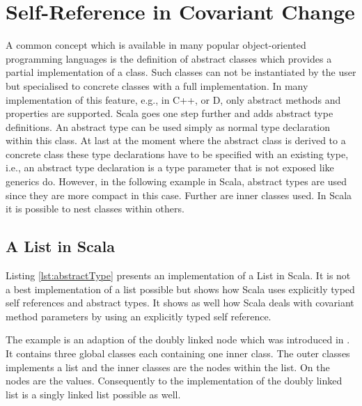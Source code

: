 \section{Self-Reference in Covariant Change}
A common concept which is available in many popular object-oriented
programming languages is the definition of abstract classes which
provides a partial implementation of a class. Such classes can not be
instantiated by the user but specialised to concrete classes with a full
implementation. In many implementation of this feature, e.g., in C++,
\cs or D, only abstract methods and properties are supported. Scala goes
one step further and adds abstract type definitions. An abstract type can
be used simply as normal type declaration within this class. At last at
the moment where the abstract class is derived to a concrete class these
type declarations have to be specified with an existing type, i.e.,
an abstract type declaration is a type parameter that is not exposed
like generics do. However, in the following example in Scala, abstract
types are used since they are more compact in this case. Further are
inner classes used. In Scala it is possible to nest classes within others.

\subsection{A List in Scala}
Listing \ref{lst:abstractType} presents an implementation of a List
in Scala. It is not a best implementation of a list possible but shows
how Scala uses explicitly typed self references and abstract types. It
shows as well how Scala deals with covariant method parameters by using
an explicitly typed self reference.

The example is an adaption of the doubly linked node which was introduced
in . It contains three global classes each
containing one inner class. The outer classes implements a list and
the inner classes are the nodes within the list. On the nodes are the
values. Consequently to the implementation of the doubly linked list is
a singly linked list possible as well.


